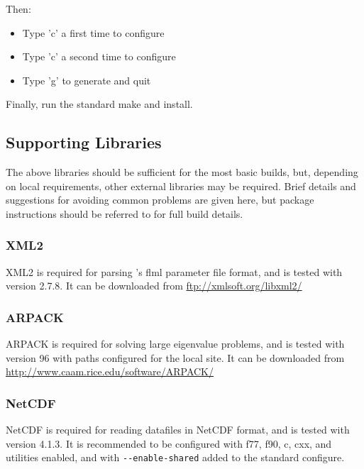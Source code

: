 Then:

\begin{itemize}
  \item Type 'c' a first time to configure
  \item Type 'c' a second time to configure
  \item Type 'g' to generate and quit
\end{itemize}

Finally, run the standard make and install.

\subsection{Supporting Libraries}
\label{sec:required_libraries_supporting}

The above libraries should be sufficient for the most basic \fluidity builds,
but, depending on local requirements, other external libraries may be required.
Brief details and suggestions for avoiding common problems are given here, but
package instructions should be referred to for full build details.

\subsubsection{XML2}
\label{sec:required_libraries_supporting_xml2}

XML2 is required for parsing \fluidity's flml parameter file format, and is
tested with version 2.7.8. It can be downloaded from \url{ftp://xmlsoft.org/libxml2/}

\subsubsection{ARPACK}
\label{sec:required_libraries_supporting_arpack}

ARPACK is required for solving large eigenvalue problems, and is tested with
version 96 with paths configured for the local site. It can be downloaded from
\url{http://www.caam.rice.edu/software/ARPACK/}

\subsubsection{NetCDF}
\label{sec:required_libraries_supporting_netcdf}

NetCDF is required for reading datafiles in NetCDF format, and is tested with
version 4.1.3. It is recommended to be configured with f77, f90, c, cxx, and
utilities enabled, and with \lstinline[language=bash]+--enable-shared+ added to
the standard configure. 

